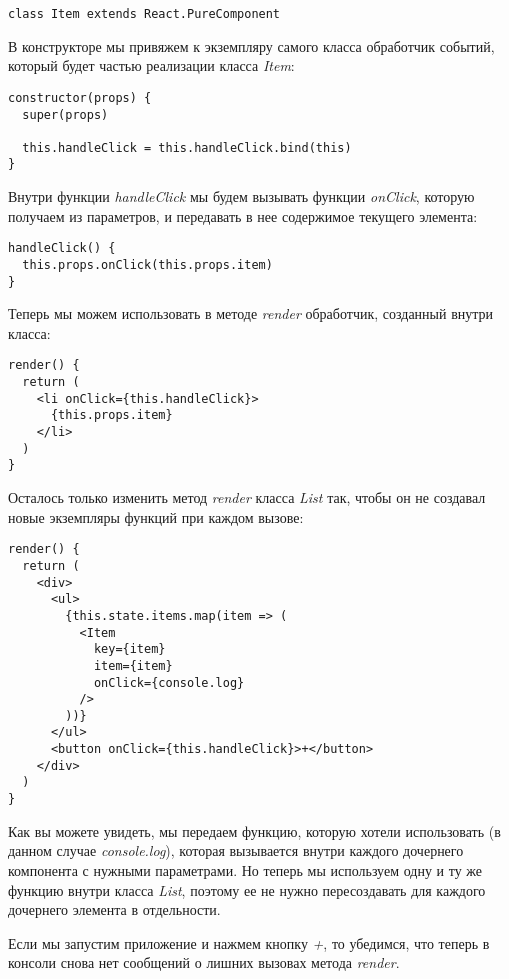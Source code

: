 \begin{lstlisting}
class Item extends React.PureComponent	
\end{lstlisting}

В конструкторе мы привяжем к экземпляру самого класса обработчик событий, который будет частью реализации класса \textit{Item}:

\begin{lstlisting}
constructor(props) {
  super(props)
  
  this.handleClick = this.handleClick.bind(this)
}
\end{lstlisting} 

Внутри функции \textit{handleClick} мы будем вызывать функции \textit{onClick}, которую получаем из параметров, и передавать в нее содержимое текущего элемента:

\begin{lstlisting}
handleClick() {
  this.props.onClick(this.props.item)
}
\end{lstlisting}

Теперь мы можем использовать в методе \textit{render} обработчик, созданный внутри класса:

\begin{lstlisting}
render() {
  return (
    <li onClick={this.handleClick}>
      {this.props.item}
    </li>
  )
}
\end{lstlisting}

Осталось только изменить метод \textit{render} класса \textit{List} так, чтобы он не создавал новые экземпляры функций при каждом вызове:

\begin{lstlisting}
render() {
  return (
    <div>
      <ul>
        {this.state.items.map(item => (
          <Item
            key={item}
            item={item}
            onClick={console.log}
          />
        ))}
      </ul>
      <button onClick={this.handleClick}>+</button>
    </div>
  )
}
\end{lstlisting}

Как вы можете увидеть, мы передаем функцию, которую хотели использовать (в данном случае \textit{console.log}), которая вызывается внутри каждого дочернего компонента с нужными параметрами. Но теперь мы используем одну и ту же функцию внутри класса \textit{List}, поэтому ее не нужно пересоздавать для каждого дочернего элемента в отдельности.

Если мы запустим приложение и нажмем кнопку \textit{+}, то убедимся, что теперь в консоли снова нет сообщений о лишних вызовах метода \textit{render}.

